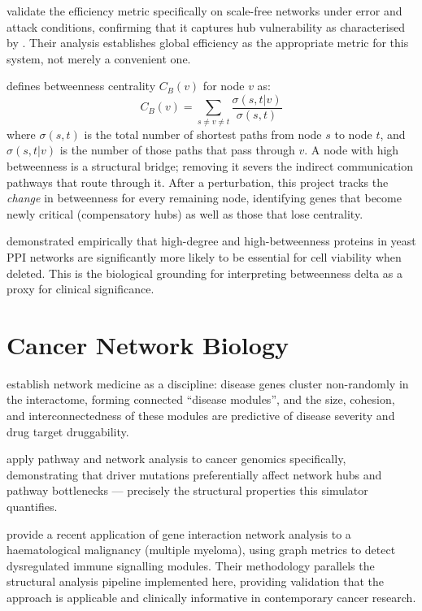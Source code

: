 \documentclass[12pt,a4paper]{report}
\begin{document}
\citet{crucitti2003efficiency} validate the efficiency metric specifically on scale-free networks under error and attack conditions, confirming that it captures hub vulnerability as characterised by \citet{albert2000error}. Their analysis establishes global efficiency as the appropriate metric for this system, not merely a convenient one.

\citet{freeman1977set} defines betweenness centrality $C_B(v)$ for node $v$ as:
\begin{equation}
  C_B(v) = \sum_{s \neq v \neq t} \frac{\sigma(s,t|v)}{\sigma(s,t)}
  \label{eq:betweenness}
\end{equation}
where $\sigma(s,t)$ is the total number of shortest paths from node $s$ to node $t$, and $\sigma(s,t|v)$ is the number of those paths that pass through $v$. A node with high betweenness is a structural bridge; removing it severs the indirect communication pathways that route through it. After a perturbation, this project tracks the \textit{change} in betweenness for every remaining node, identifying genes that become newly critical (compensatory hubs) as well as those that lose centrality.

\citet{jeong2001lethality} demonstrated empirically that high-degree and high-betweenness proteins in yeast PPI networks are significantly more likely to be essential for cell viability when deleted. This is the biological grounding for interpreting betweenness delta as a proxy for clinical significance.

\section{Cancer Network Biology}

\citet{barabasi2011network} establish network medicine as a discipline: disease genes cluster non-randomly in the interactome, forming connected ``disease modules'', and the size, cohesion, and interconnectedness of these modules are predictive of disease severity and drug target druggability.

\citet{creixell2021pathway} apply pathway and network analysis to cancer genomics specifically, demonstrating that driver mutations preferentially affect network hubs and pathway bottlenecks — precisely the structural properties this simulator quantifies.

\citet{simhal2023gene} provide a recent application of gene interaction network analysis to a haematological malignancy (multiple myeloma), using graph metrics to detect dysregulated immune signalling modules. Their methodology parallels the structural analysis pipeline implemented here, providing validation that the approach is applicable and clinically informative in contemporary cancer research.
\end{document}
